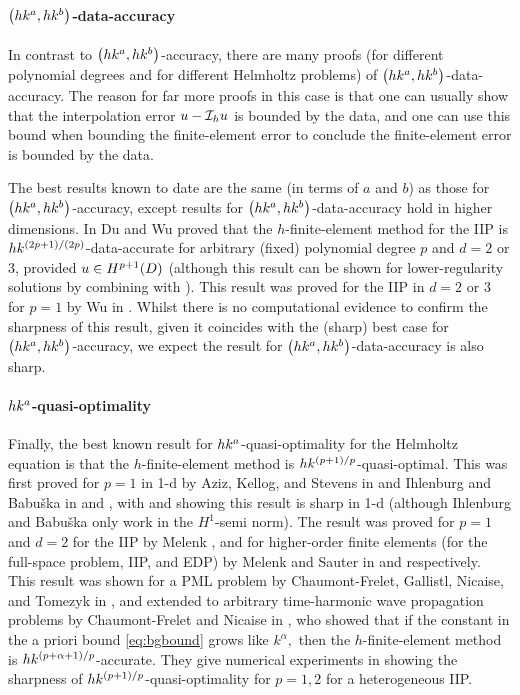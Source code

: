 \paragraph{$\hk{a}b$-data-accuracy} In contrast to $\hk{a}b$-accuracy, there are many proofs (for different polynomial degrees and for different Helmholtz problems) of $\hk{a}b$-data-accuracy. The reason for far more proofs in this case is that one can usually show that the interpolation error $u -\mathcal I_{h} u$ is bounded by the data, and one can use this bound when bounding the finite-element error to conclude the finite-element error is bounded by the data.

The best results known to date are the same (in terms of $a$ and $b$) as those for $\hk{a}b$-accuracy, except results for $\hk{a}b$-data-accuracy hold in higher dimensions. In \cite[Theorem 5.1, Corollary 5.2]{DuWu:15} Du and Wu proved that the $h$-finite-element method for the IIP is $hk^{(2p+1)/(2p)}$-data-accurate for arbitrary (fixed) polynomial degree $p$ and $d = 2$ or $3$, provided $u \in \HppoD$ (although this result can be shown for lower-regularity solutions by combining \cite[Theorem 5.1]{DuWu:15} with \cite[Lemma 3.5]{DuWu:15}). This result was proved for the IIP in $d = 2$ or $3$ for $p=1$ by Wu in \cite{Wu:14}. Whilst there is no computational evidence to confirm the sharpness of this result, given it coincides with the (sharp) best case for $\hk{a}b$-accuracy, we expect the result for $\hk{a}b$-data-accuracy is also sharp.

\paragraph{$hk^{a}$-quasi-optimality} Finally, the best known result for $hk^{a}$-quasi-optimality for the Helmholtz equation is that the $h$-finite-element method is $hk^{(p+1)/p}$-quasi-optimal. This was first proved for $p=1$ in 1-d by Aziz, Kellog, and Stevens in \cite[Theorem 3.1]{AzKeSt:88} and Ihlenburg and Babu\v{s}ka in \cite[Theorem 3]{IhBa:95a} and \cite[Theorems 4.9 and 4.13]{Ih:98}, with \cite[Figures 7-9]{IhBa:95a} and \cite[Section 4.5.4 and Figures 4.11-4.12]{Ih:98} showing this result is sharp in 1-d (although Ihlenburg and Babu\v{s}ka only work in the $H^1$-semi norm). The result was proved for $p=1$ and $d=2$ for the IIP by Melenk \cite[Proposition 8.2.7]{Me:95}, and for higher-order finite elements (for the full-space problem, IIP, and EDP) by Melenk and Sauter in \cite[Corollary 5.6]{MeSa:10} and \cite[Theorem 5.8]{MeSa:11} respectively. This result was shown for a PML problem by Chaumont-Frelet, Gallistl, Nicaise, and Tomezyk in \cite[Theorem 5.1]{ChGaNiTo:18}, and extended to arbitrary time-harmonic wave propagation problems by Chaumont-Frelet and Nicaise in \cite[Theorem 2.15]{ChNi:19}, who showed that if the constant in the a priori bound \cref{eq:bgbound} grows like $k^\alpha,$ then the $h$-finite-element method is $hk^{(p+\alpha+1)/p}$-accurate. They give numerical experiments in \cite[Figure 8]{ChNi:19} showing the sharpness of $hk^{(p+1)/p}$-quasi-optimality for $p=1, 2$ for a heterogeneous IIP.

